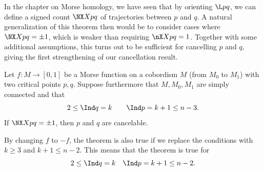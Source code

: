 In the chapter on Morse homology, we have seen that by orienting $\L pq$, we can define a signed count $\NX Xpq$ of trajectories between $p$ and $q$.
A natural generalization of this theorem then would be to consider cases where $\NX Xpq = \pm 1$, which is weaker than requiring $\nX Xpq = 1$.
Together with some additional assumptions, this turns out to be sufficient for cancelling $p$ and  $q$, giving the first strengthening of our cancellation result.

\begin{theorem}
    Let $f: M \to  [0,1]$ be a Morse function on a cobordism $M$ (from $M_0$ to $M_1$) with two critical points $p, q$.
    Suppose furthermore that $M, M_0, M_1$ are simply connected and that
    \[
    2 \le \Ind q = k  \qquad \Ind p = k+1 \le  n-3
    .\] 
    If $\NX X p q = \pm 1$, then  $p$ and  $q$ are cancelable.
    \label{thm:cancel-second}
\end{theorem}
\begin{remark}
    By changing $f$ to $-f$, the theorem is also true if we replace the conditions with  $k \ge  3$ and $k + 1 \le  n-2$.
    This means that the theorem is true for 
    \[
    2 \le  \Ind q = k \quad \Ind p = k + 1 \le n-2
    .\] 
\end{remark}

